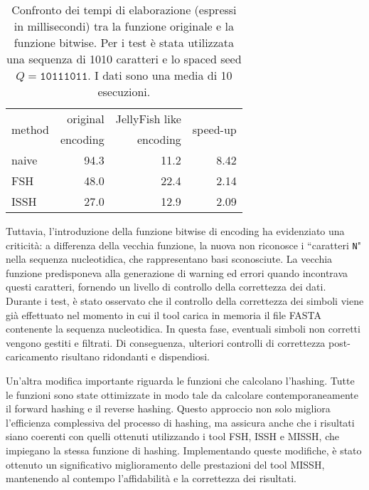 \begin{table}[!ht]
	\centering
	\begin{tabular}{l | rr | r}
		\multirow{2}{*}{method} & original & JellyFish like & \multirow{2}{*}{speed-up} \\
		& encoding & encoding & \\
		\toprule
		naive & 94.3 & 11.2 & 8.42 \\
		FSH & 48.0 & 22.4 & 2.14 \\
		ISSH & 27.0 & 12.9 & 2.09 \\
		\bottomrule
	\end{tabular}
	\caption[Confronto dei tempi di elaborazione tra la funzione originale e la funzione bitwise.]{Confronto dei tempi di elaborazione (espressi in millisecondi) tra la funzione originale e la funzione bitwise. Per i test è stata utilizzata una sequenza di 1010 caratteri e lo spaced seed $Q = \texttt{10111011}$. I dati sono una media di 10 esecuzioni.}
	\label{tab:}
\end{table}

Tuttavia, l'introduzione della funzione bitwise di encoding ha evidenziato una criticità: a differenza della vecchia funzione, la nuova non riconosce i “caratteri \texttt{N}" nella sequenza nucleotidica, che rappresentano basi sconosciute. La vecchia funzione predisponeva alla generazione di warning ed errori quando incontrava questi caratteri, fornendo un livello di controllo della correttezza dei dati. Durante i test, è stato osservato che il controllo della correttezza dei simboli viene già effettuato nel momento in cui il tool carica in memoria il file FASTA contenente la sequenza nucleotidica. In questa fase, eventuali simboli non corretti vengono gestiti e filtrati. Di conseguenza, ulteriori controlli di correttezza post-caricamento risultano ridondanti e dispendiosi.

Un'altra modifica importante riguarda le funzioni che calcolano l'hashing. Tutte le funzioni sono state ottimizzate in modo tale da calcolare contemporaneamente il forward hashing e il reverse hashing. Questo approccio non solo migliora l'efficienza complessiva del processo di hashing, ma assicura anche che i risultati siano coerenti con quelli ottenuti utilizzando i tool \acs{FSH}, \acs{ISSH} e \acs{MISSH}, che impiegano la stessa funzione di hashing. Implementando queste modifiche, è stato ottenuto un significativo miglioramento delle prestazioni del tool \acs{MISSH}, mantenendo al contempo l'affidabilità e la correttezza dei risultati.




